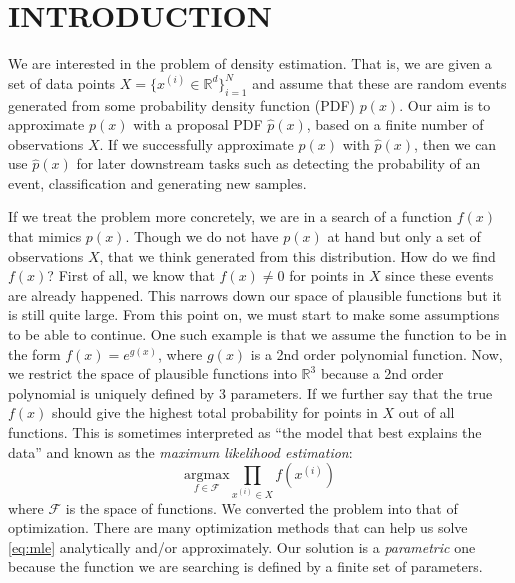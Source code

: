 \documentclass[a4paper,onesided,12pt]{report}
\begin{document}
\begin{abbreviations}
\end{abbreviations}


\chapter{INTRODUCTION}
\label{chapter:intro}

We are interested in the problem of density estimation. That is, we are given a set of data points $X = \{x^{(i)} \in \mathbb{R}^d\}_{i=1}^N$ and assume that these are random events generated from some probability density function (PDF) $p(x)$. Our aim is to approximate $p(x)$ with a proposal PDF $\hat{p}(x)$, based on a finite number of observations $X$. If we successfully approximate $p(x)$ with $\hat{p}(x)$, then we can use $\hat{p}(x)$ for later downstream tasks such as detecting the probability of an event, classification and generating new samples.

If we treat the problem more concretely, we are in a search of a function $f(x)$ that mimics $p(x)$. Though we do not have $p(x)$ at hand but only a set of observations $X$, that we think generated from this distribution. How do we find $f(x)$? First of all, we know that $f(x) \neq 0$ for points in $X$ since these events are already happened. This narrows down our space of plausible functions but it is still quite large. From this point on, we must start to make some assumptions to be able to continue. One such example is that we assume the function to be in the form $f(x)=e^{g(x)}$, where $g(x)$ is a 2nd order polynomial function. Now, we restrict the space of plausible functions into $\mathbb{R}^3$ because a 2nd order polynomial is uniquely defined by 3 parameters. If we further say that the true $f(x)$ should give the highest total probability for points in $X$ out of all functions. This is sometimes interpreted as ``the model that best explains the data'' and known as the \emph{maximum likelihood estimation}:
\begin{equation}
\underset{f \in \mathcal{F}}{\text{argmax}} \prod_{x^{(i)} \in X} f(x^{(i)}) 
\label{eq:mle}
\end{equation}
where $\mathcal{F}$ is the space of functions. We converted the problem into that of optimization. There are many optimization methods that can help us solve \ref{eq:mle} analytically and/or approximately. Our solution is a \emph{parametric} one because the function we are searching is defined by a finite set of parameters.
\end{document}
